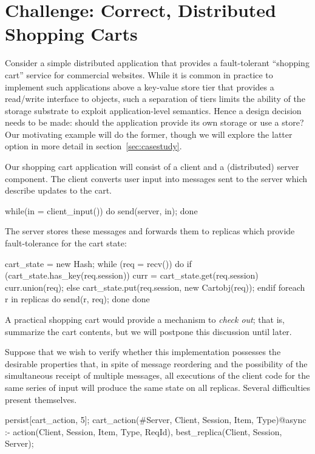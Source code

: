 \section{Challenge: Correct, Distributed Shopping Carts}

Consider a simple distributed application that provides a fault-tolerant
``shopping cart'' service for commercial websites.  While it is common in
practice to implement such applications above a key-value store tier that
provides a read/write interface to objects, such a separation of tiers limits
the ability of the storage substrate to exploit application-level semantics.
Hence a design decision needs to be made: should the application provide 
its own storage or use a store?  Our motivating example will do the former,
though we will explore the latter option in more detail in section~\ref{sec:casestudy}.

Our shopping cart application will consist of a client and a (distributed)
server component.  The client converts user input into messages sent to
the server which describe updates to the cart.   

\begin{Dedalus}
while(in = client_input()) do
  send(server, in);
done
\end{Dedalus}

The server stores these messages
and forwards them to replicas which provide fault-tolerance for the cart state:


\begin{Dedalus}
cart_state = new Hash;
while (req = recv()) do
  if (cart_state.has_key(req.session)) 
    curr = cart_state.get(req.session)
    curr.union(req);
  else 
    cart_state.put(req.session, new Cartobj(req));
  endif
  foreach r in replicas do
    send(r, req);
  done
done
\end{Dedalus}
A practical shopping cart would provide a mechanism to {\em check out}; that is,
summarize the cart contents, but we will postpone this discussion until later.

Suppose that we wish to verify whether this implementation possesses the desirable 
properties that, in spite of message reordering and the possibility of the simultaneous
receipt of multiple messages, all executions of the client code for the same series of
input will produce the same state on all replicas.  Several difficulties present themselves.

\begin{Dedalus}
persist[cart_action, 5];
cart_action(#Server, Client, Session, Item, Type)@async :-
  action(Client, Session, Item, Type, ReqId),
  best_replica(Client, Session, Server);
\end{Dedalus}



